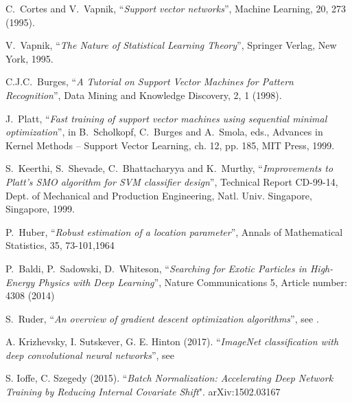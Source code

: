 \begin{thebibliography}{99}
  C.~Cortes and V.~Vapnik, 
                       ``{\em Support vector networks}'', 
                       Machine Learning, 20, 273 (1995). 

  V.~Vapnik, ``{\em The Nature of Statistical Learning Theory}'', 
                       Springer Verlag, New York, 1995.

       C.J.C.~Burges, 
                       ``{\em A Tutorial on Support Vector Machines for Pattern Recognition}'', 
                       Data Mining and Knowledge Discovery, 2, 1 (1998).

        J.~Platt,
                       ``{\em Fast training of support vector machines using sequential 
                       minimal optimization}'', 
                       in B.~Scholkopf, C.~Burges and A.~Smola, eds., 
                       Advances in Kernel Methods -- Support Vector Learning, 
                       ch. 12, pp. 185, MIT Press, 1999.

      S.~Keerthi, S.~Shevade, C.~Bhattacharyya and K.~Murthy, 
                       ``{\em Improvements to Platt's SMO algorithm for SVM classifier 
                       design}'', 
                       Technical Report CD-99-14, Dept. of Mechanical and Production Engineering, 
                       Natl. Univ. Singapore, Singapore, 1999.

	      P.~Huber,
                        ``{\em Robust estimation of a location parameter}'',
                        Annals of Mathematical Statistics, 35, 73-101,1964

     P.~Baldi, P.~Sadowski, D.~Whiteson,
                        ``{\em Searching for Exotic Particles in High-Energy Physics 
                         with Deep Learning}'', Nature Communications 5,
                       Article number: 4308 (2014)

  S.~Ruder, ``{\em An overview of gradient descent optimization algorithms}'',
  see   .

   A. Krizhevsky, I. Sutskever, G. E. Hinton (2017). ``{\em ImageNet classification with deep convolutional neural networks}'',
   see 

   S. Ioffe,  C. Szegedy (2015). ``{\em Batch Normalization: Accelerating Deep Network Training by Reducing Internal Covariate Shift}". arXiv:1502.03167



\end{thebibliography}
